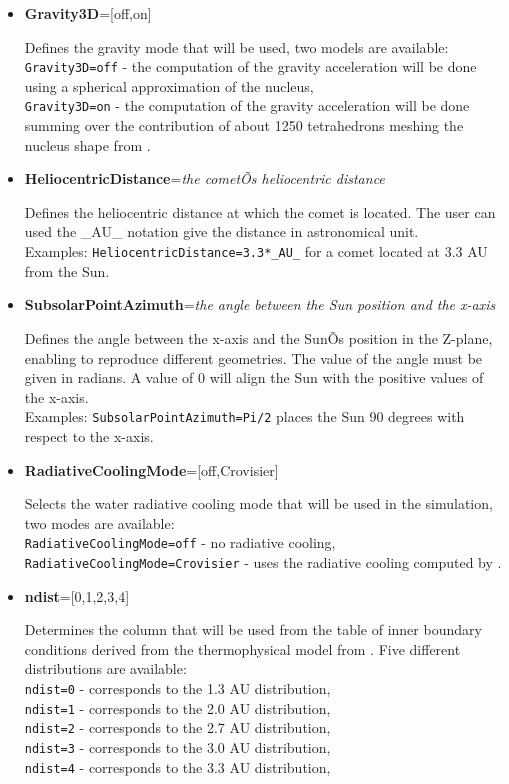 \begin{itemize}

\item {\bf Gravity3D}=[off,on] 

Defines the gravity mode that will be used, two models are available:
\\{\tt Gravity3D=off} - the computation of the gravity acceleration will be done using a spherical approximation of the nucleus,
\\{\tt Gravity3D=on} - the computation of the gravity acceleration will be done summing over the contribution of about 1250 tetrahedrons meshing the nucleus shape from \cite{Lamy-2006-AA}.

\item {\bf HeliocentricDistance}={\it the cometÕs heliocentric distance}

Defines the heliocentric distance at which the comet is located. The user can used the \_AU\_ notation give the distance in astronomical unit.
\\Examples: {\tt HeliocentricDistance=3.3*\_AU\_} for a comet located at 3.3 AU from the Sun.

\item {\bf SubsolarPointAzimuth}={\it the angle between the Sun position and the x-axis}

Defines the angle between the x-axis and the SunÕs position in the Z-plane, enabling to reproduce different geometries. The value of the angle must be given in radians. A value of 0 will align the Sun with the positive values of the x-axis. 
\\Examples: {\tt SubsolarPointAzimuth=Pi/2} places the Sun 90 degrees with respect to the x-axis. 

\item {\bf RadiativeCoolingMode}=[off,Crovisier]

Selects the water radiative cooling mode that will be used in the simulation, two modes are available:
\\{\tt RadiativeCoolingMode=off} - no radiative cooling,
\\{\tt RadiativeCoolingMode=Crovisier} - uses the radiative cooling computed by \cite{Crovisier-1984-AA}.

\item {\bf ndist}=[0,1,2,3,4]

Determines the column that will be used from the table of inner boundary conditions derived from the thermophysical model from \cite{Davidsson-2004-icarus,Davidsson-2005-icarus,Davidsson-2006-icarus}. Five different distributions are available:
\\{\tt ndist=0} - corresponds to the 1.3 AU distribution,
\\{\tt ndist=1} - corresponds to the 2.0 AU distribution,
\\{\tt ndist=2} - corresponds to the 2.7 AU distribution,
\\{\tt ndist=3} - corresponds to the 3.0 AU distribution,
\\{\tt ndist=4} - corresponds to the 3.3 AU distribution,


\end{itemize}
